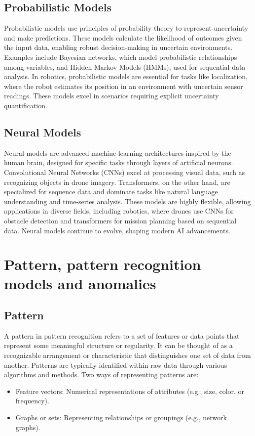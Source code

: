 \subsection{Probabilistic Models}
Probabilistic models use principles of probability theory to represent uncertainty and make predictions. These models calculate the likelihood of outcomes given the input data, enabling robust decision-making in uncertain environments. Examples include Bayesian networks, which model probabilistic relationships among variables, and Hidden Markov Models (HMMs), used for sequential data analysis. In robotics, probabilistic models are essential for tasks like localization, where the robot estimates its position in an environment with uncertain sensor readings. These models excel in scenarios requiring explicit uncertainty quantification. \cite{pearl-1988-bayesian-networks}

\subsection{Neural Models}
Neural models are advanced machine learning architectures inspired by the human brain, designed for specific tasks through layers of artificial neurons. Convolutional Neural Networks (CNNs) excel at processing visual data, such as recognizing objects in drone imagery. Transformers, on the other hand, are specialized for sequence data and dominate tasks like natural language understanding and time-series analysis. These models are highly flexible, allowing applications in diverse fields, including robotics, where drones use CNNs for obstacle detection and transformers for mission planning based on sequential data. Neural models continue to evolve, shaping modern AI advancements. \cite{vaswani-2017-attention-transformers}






\section{Pattern, pattern recognition models and anomalies}
    \subsection{Pattern} A pattern in pattern recognition refers to a set of features or data points that represent some meaningful structure or regularity. It can be thought of as a recognizable arrangement or characteristic that distinguishes one set of data from another. Patterns are typically identified within raw data through various algorithms and methods. Two ways of representing patterns are:
    \begin{itemize}
        \item Feature vectors: Numerical representations of attributes (e.g., size, color, or frequency).
        \item Graphs or sets: Representing relationships or groupings (e.g., network graphs).
    \end{itemize}
